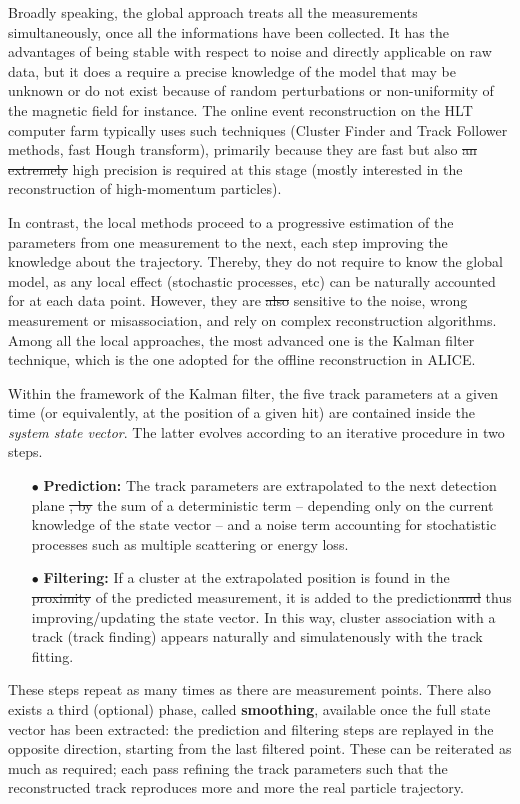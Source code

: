 \documentclass[ALICE,manyauthors]{cernphprep}
\providecommand{\DIFaddtex}[1]{{\protect\color{blue}\uwave{#1}}} %
\providecommand{\DIFdeltex}[1]{{\protect\color{red}\sout{#1}}}                      %
\providecommand{\DIFaddbegin}{} %
\providecommand{\DIFaddend}{} %
\providecommand{\DIFdelbegin}{} %
\providecommand{\DIFdelend}{} %
\providecommand{\DIFadd}[1]{\texorpdfstring{\DIFaddtex{#1}}{#1}} %
\providecommand{\DIFdel}[1]{\texorpdfstring{\DIFdeltex{#1}}{}} %
\newcommand{\DIFscaledelfig}{0.5}
\newlength{\DIFdelgraphicswidth} %
\newlength{\DIFdelgraphicsheight} %
\newcommand{\DIFaddincludegraphics}[2][]{{\color{blue}\fbox{\DIFOincludegraphics[#1]{#2}}}} %
\newcommand{\DIFdelincludegraphics}[2][]{%
\sbox{\DIFdelgraphicsbox}{\DIFOincludegraphics[#1]{#2}}%
\settoboxwidth{\DIFdelgraphicswidth}{\DIFdelgraphicsbox} %
\settoboxtotalheight{\DIFdelgraphicsheight}{\DIFdelgraphicsbox} %
\scalebox{\DIFscaledelfig}{%
\parbox[b]{\DIFdelgraphicswidth}{\usebox{\DIFdelgraphicsbox}\\[-\baselineskip] \rule{\DIFdelgraphicswidth}{0em}}\llap{\resizebox{\DIFdelgraphicswidth}{\DIFdelgraphicsheight}{%
\setlength{\unitlength}{\DIFdelgraphicswidth}%
\begin{picture}(1,1)%
\thicklines\linethickness{2pt} %
{\color[rgb]{1,0,0}\put(0,0){\framebox(1,1){}}}%
{\color[rgb]{1,0,0}\put(0,0){\line( 1,1){1}}}%
{\color[rgb]{1,0,0}\put(0,1){\line(1,-1){1}}}%
\end{picture}%
}\hspace*{3pt}}} %
} %
\DeclareRobustCommand{\DIFaddbegin}{\DIFOaddbegin \let\includegraphics\DIFaddincludegraphics} %
\DeclareRobustCommand{\DIFaddend}{\DIFOaddend \let\includegraphics\DIFOincludegraphics} %
\DeclareRobustCommand{\DIFdelbegin}{\DIFOdelbegin \let\includegraphics\DIFdelincludegraphics} %
\DeclareRobustCommand{\DIFdelend}{\DIFOaddend \let\includegraphics\DIFOincludegraphics} %
\begin{document}
Broadly speaking, the global approach treats all the measurements simultaneously, once all the informations have been collected. It has the advantages of being stable with respect to noise and directly applicable on raw data, but it does a require a precise knowledge of the model that may be unknown or do not exist because of random perturbations or non-uniformity of the magnetic field for instance. The online event reconstruction on the HLT computer farm typically uses such techniques (Cluster Finder and Track Follower methods, fast Hough transform), primarily because they are fast but also \DIFdelbegin \DIFdel{an extremely }\DIFdelend \DIFaddbegin \DIFadd{a }\DIFaddend high precision is \DIFaddbegin \DIFadd{not }\DIFaddend required at this stage (mostly interested in the reconstruction of high-momentum particles).

In contrast, the local methods proceed to a progressive estimation of the parameters  from one measurement to the next, each step improving the knowledge about the trajectory. Thereby, they do not require to know the global model, as any local effect (stochastic processes, etc) can be naturally accounted for at each data point. However, they are \DIFdelbegin \DIFdel{also }\DIFdelend sensitive to the noise, wrong measurement or misassociation, and rely on complex reconstruction algorithms. Among all the local approaches, the most advanced one is the Kalman filter technique, which is the one adopted for the offline reconstruction in ALICE. 

Within the framework of the Kalman filter, the five track parameters at a given time (or equivalently, at the position of a given hit) are contained inside the \textit{system state vector}. The latter evolves according to an iterative procedure in two steps. 
\begin{itemize}
\item[$\bullet$] \textbf{Prediction:} The track parameters are extrapolated to the next detection plane \DIFdelbegin \DIFdel{, by }\DIFdelend \DIFaddbegin \DIFadd{as }\DIFaddend the sum of a deterministic term -- depending only on the current knowledge of the state vector -- and a noise term accounting for stochatistic processes such as multiple scattering or energy loss.
\item[$\bullet$] \textbf{Filtering:} If a cluster at the extrapolated position is found in the \DIFdelbegin \DIFdel{proximity }\DIFdelend \DIFaddbegin \DIFadd{vicinity }\DIFaddend of the predicted measurement, it is added to the prediction\DIFdelbegin \DIFdel{and }\DIFdelend \DIFaddbegin \DIFadd{, }\DIFaddend thus improving/updating the state vector. In this way, cluster association with a track (track finding) appears naturally and simulatenously with the track fitting.
\end{itemize}
These steps repeat as many times as there are measurement points. There also exists a third (optional) phase, called \textbf{smoothing}, available once the full state vector has been extracted: the prediction and filtering steps are replayed in the opposite direction, starting from the last filtered point. These can be reiterated as much as required; each pass refining the track parameters such that the reconstructed track reproduces more and more the real particle trajectory.
\end{document}
